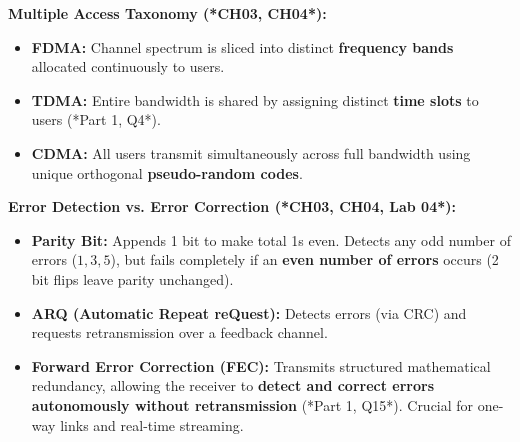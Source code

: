 \documentclass[10pt,a4paper]{article}
\begin{document}
\begin{tcolorbox}[
    colframe=themeblue,
    colback=lightbg,
    arc=1.2mm,
    boxrule=0.5pt,
    left=5pt, right=5pt, top=2.5pt, bottom=2.5pt
]
\footnotesize
\textbf{Multiple Access Taxonomy (*CH03, CH04*):}
\begin{itemize}[leftmargin=12pt, itemsep=1pt]
    \item \textbf{FDMA:} Channel spectrum is sliced into distinct \textbf{frequency bands} allocated continuously to users.
    \item \textbf{TDMA:} Entire bandwidth is shared by assigning distinct \textbf{time slots} to users (*Part 1, Q4*).
    \item \textbf{CDMA:} All users transmit simultaneously across full bandwidth using unique orthogonal \textbf{pseudo-random codes}.
\end{itemize}
\textbf{Error Detection vs. Error Correction (*CH03, CH04, Lab 04*):}
\begin{itemize}[leftmargin=12pt, itemsep=1pt]
    \item \textbf{Parity Bit:} Appends 1 bit to make total 1s even. Detects any odd number of errors ($1, 3, 5$), but fails completely if an \textbf{even number of errors} occurs (2 bit flips leave parity unchanged).
    \item \textbf{ARQ (Automatic Repeat reQuest):} Detects errors (via CRC) and requests retransmission over a feedback channel.
    \item \textbf{Forward Error Correction (FEC):} Transmits structured mathematical redundancy, allowing the receiver to \textbf{detect and correct errors autonomously without retransmission} (*Part 1, Q15*). Crucial for one-way links and real-time streaming.
\end{itemize}
\end{tcolorbox}

\vspace{2pt}

\par\vspace{2pt}
\end{document}
